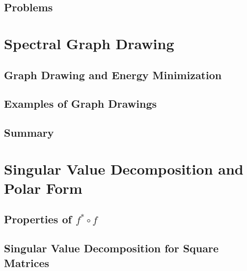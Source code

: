 \documentclass[a4paper]{article}
\begin{document}
\subsection{ Problems} %


\newpage
\section{Spectral Graph Drawing}
\subsection{ Graph Drawing and Energy Minimization} %

\subsection{ Examples of Graph Drawings} %

\subsection{ Summary} %


\newpage
\section{Singular Value Decomposition and Polar Form}
\subsection{ Properties of $f^* \circ f$} %

\subsection{ Singular Value Decomposition for Square Matrices} %
\end{document}
